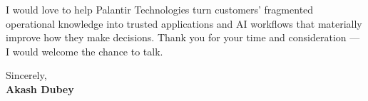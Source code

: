 \documentclass[letterpaper,11pt]{article}
\begin{document}
I would love to help Palantir Technologies turn customers' fragmented operational knowledge into trusted applications and AI workflows that materially improve how they make decisions. Thank you for your time and consideration --- I would welcome the chance to talk.

\vspace{6pt}
Sincerely, \\
\textbf{Akash Dubey}
\end{document}
